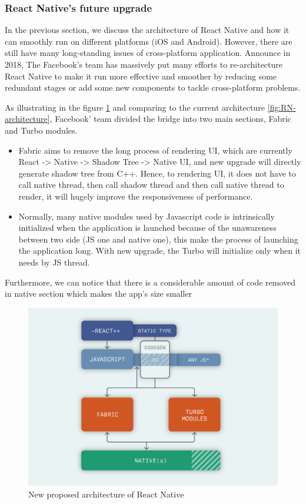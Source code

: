 \subsubsection{React Native's future upgrade}
In the previous section, we discuss the architecture of React Native and how it can smoothly run on different platforms (iOS and Android). However, there are still have many long-standing issues of cross-platform application. Announce in 2018, The Facebook's team has massively put many efforts to re-architecture React Native to make it run more effective and smoother by reducing some redundant stages or add some new components to tackle cross-platform problems. 

As illustrating in the figure \ref{fig:RN-new-architecture} and comparing to the current architecture \ref{fig:RN-architecture}, Facebook' team divided the bridge into two main sections, Fabric and Turbo modules. 
\begin{itemize}
\item Fabric aims to remove the long process of rendering UI, which are currently React -> Native -> Shadow Tree -> Native UI, and new upgrade will directly generate shadow tree from C++. Hence, to rendering UI, it does not have to call native thread, then call shadow thread and then call native thread to render, it will hugely improve the responsiveness of performance. 
\item Normally, many native modules used by Javascript code is intrinsically initialized when the application is launched because of the unawareness between two side (JS one and native one), this make the process of launching the application long. With new upgrade, the Turbo will initialize only when it needs by JS thread.
\end{itemize}

Furthermore, we can notice that there is a considerable amount of code removed in native section which makes the app's size smaller 
\begin{figure}[!h]
   	\centering
    	\includegraphics[scale=0.4]{Picture/mobile/RN-new-architecture.png}
    	\caption{New proposed architecture of React Native}
	\label{fig:RN-new-architecture}
\end{figure}


